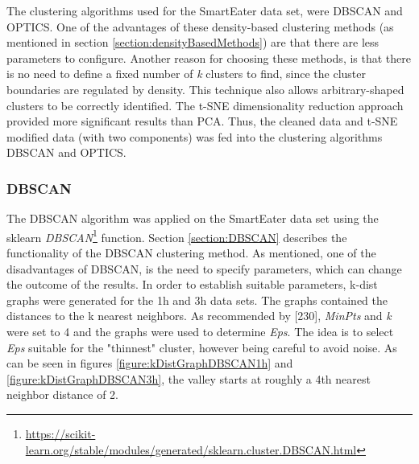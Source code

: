 The clustering algorithms used for the SmartEater data set, were DBSCAN and OPTICS. One of the advantages of these density-based clustering methods (as mentioned in section \ref{section:densityBasedMethods}) are that there are less parameters to configure. Another reason for choosing these methods, is that there is no need to define a fixed number of \textit{k} clusters to find, since the cluster boundaries are regulated by density. This technique also allows arbitrary-shaped clusters to be correctly identified. The t-SNE dimensionality reduction approach provided more significant results than PCA. Thus, the cleaned data and t-SNE modified data (with two components) was fed into the clustering algorithms DBSCAN and OPTICS.

\subsubsection{DBSCAN}
The DBSCAN algorithm was applied on the SmartEater data set using the sklearn \textit{DBSCAN}\footnote{\url{https://scikit-learn.org/stable/modules/generated/sklearn.cluster.DBSCAN.html}} function.
Section \ref{section:DBSCAN} describes the functionality of the DBSCAN clustering method. As mentioned, one of the disadvantages of DBSCAN, is the need to specify parameters, which can change the outcome of the results. In order to establish suitable parameters, k-dist graphs were generated for the 1h and 3h data sets. The graphs contained the distances to the k nearest neighbors. As recommended by \textcite{DBSCAN}[230], \textit{MinPts} and \textit{k} were set to 4 and the graphs were used to determine \textit{Eps}. The idea is to select \textit{Eps} suitable for the "thinnest" cluster, however being careful to avoid noise. As can be seen in figures \ref{figure:kDistGraphDBSCAN1h} and \ref{figure:kDistGraphDBSCAN3h}, the valley starts at roughly a 4th nearest neighbor distance of 2. 




